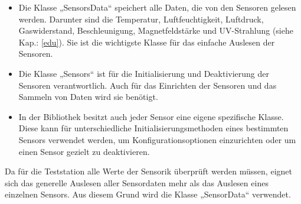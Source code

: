 \begin{itemize}
	\item Die Klasse „SensorsData“ speichert alle Daten, die von den Sensoren gelesen werden. Darunter sind die Temperatur, Luftfeuchtigkeit, Luftdruck, Gaswiderstand, Beschleunigung, Magnetfeldstärke und UV-Strahlung (siehe Kap.: \ref{edu}). Sie ist die wichtigste Klasse für das einfache Auslesen der Sensoren.
	\item Die Klasse „Sensors“ ist für die Initialisierung und Deaktivierung der Sensoren verantwortlich. Auch für das Einrichten der Sensoren und das Sammeln von Daten wird sie benötigt.
	\item In der Bibliothek besitzt auch jeder Sensor eine eigene spezifische Klasse. Diese kann für unterschiedliche Initialisierungsmethoden eines bestimmten Sensors verwendet werden, um Konfigurationsoptionen einzurichten oder um einen Sensor gezielt zu deaktivieren.
\end{itemize}
Da für die Teststation alle Werte der Sensorik überprüft werden müssen, eignet sich das generelle Auslesen aller Sensordaten mehr als das Auslesen eines einzelnen Sensors. Aus diesem Grund wird die Klasse „SensorData“ verwendet. 
